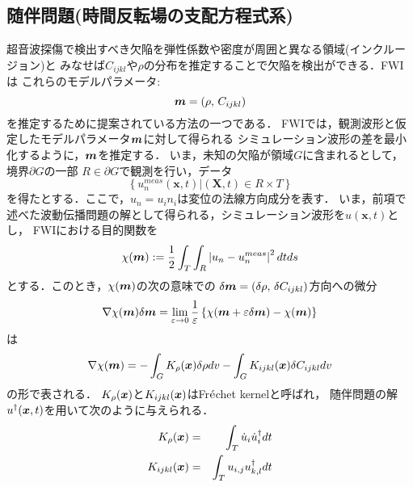 \subsection{随伴問題(時間反転場の支配方程式系)}
超音波探傷で検出すべき欠陥を弾性係数や密度が周囲と異なる領域(インクルージョン)と
みなせば$C_{ijkl}$や$\rho$の分布を推定することで欠陥を検出ができる．FWIは
これらのモデルパラメータ:
\begin{equation}
	\boldsymbol{m}=\left( \rho, \, C_{ijkl}\right)
	\label{eqn:mprms}
\end{equation}
を推定するために提案されている方法の一つである．
FWIでは，観測波形と仮定したモデルパラメータ$\boldsymbol{m}$に対して得られる
シミュレーション波形の差を最小化するように，$\boldsymbol{m}$を推定する．
いま，未知の欠陥が領域$G$に含まれるとして，境界$\partial G$の一部
$R\in\partial G$で観測を行い，データ
\begin{equation}
	\left\{ 
	\left. 
	u_n^{meas}(\boldsymbol{x},t)\right|  (\boldsymbol{X},t)\in R\times T
	\right\}
	\label{eqn:data}
\end{equation}
を得たとする．ここで，$u_n=u_in_i$は変位の法線方向成分を表す．
いま，前項で述べた波動伝播問題の解として得られる，シミュレーション波形を$u(\boldsymbol{x},t)$とし，
FWIにおける目的関数を
\begin{equation}
	\chi(\boldsymbol{m}):= \frac{1}{2} \int _T\int _R \left|u_n-u_n^{meas}\right|^2 dtds
	\label{eqn:cost}
\end{equation}
とする．このとき，$\chi(\boldsymbol{m})$の次の意味での
$\delta \boldsymbol{m}=(\delta \rho,\, \delta C_{ijkl})$方向への微分
\begin{equation}
	\nabla \chi (\boldsymbol{m})\delta \boldsymbol{m} = \lim_{\varepsilon \rightarrow 0}
	\frac{1}{\varepsilon}
	\left\{
		\chi(\boldsymbol{m}+\varepsilon \delta \boldsymbol{m})
		-
		\chi(\boldsymbol{m})
	\right\}
	\label{eqn:}
\end{equation}
は
\begin{equation}
	\nabla \chi(\boldsymbol{m}) = 
	-\int_G K_{\rho}(\boldsymbol{x})\delta \rho dv
	- 
	\int_G K_{ijkl}(\boldsymbol{x}) \delta C_{ijkl} dv
	\label{eqn:}
\end{equation}
の形で表される．
$K_\rho(\boldsymbol{x})$と$K_{ijkl}(\boldsymbol{x})$はFr$\acute{\rm e}$chet kernelと呼ばれ，
随伴問題の解$u^{\dagger}(\boldsymbol{x},t)$を用いて次のように与えられる．
\begin{eqnarray}
	K_\rho(\boldsymbol{x}) &= & \int _T \dot{u}_i \dot{u}^{\dagger}_i dt 
	\label{eqn:Frechet_rho}
	\\
	K_{ijkl}(\boldsymbol{x}) &= & \int _T u_{i,j} u^{\dagger}_{k,l} dt 
	\label{eqn:Frechet_C}
\end{eqnarray}

